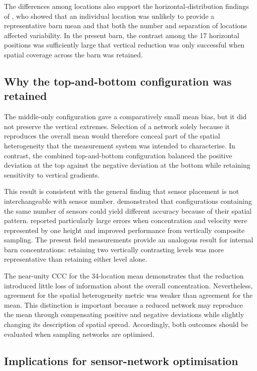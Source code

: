 \documentclass[12pt,a4paper]{article}
\begin{document}
The differences among locations also support the horizontal-distribution
findings of \citet{Durso2022}, who showed that an individual location was
unlikely to provide a representative barn mean and that both the number and
separation of locations affected variability. In the present barn, the
contrast among the 17 horizontal positions was sufficiently large that
vertical reduction was only successful when spatial coverage across the barn
was retained.

\subsection{Why the top-and-bottom configuration was retained}

The middle-only configuration gave a comparatively small mean bias, but it did
not preserve the vertical extremes. Selection of a network solely because it
reproduces the overall mean would therefore conceal part of the spatial
heterogeneity that the measurement system was intended to characterise. In
contrast, the combined top-and-bottom configuration balanced the positive
deviation at the top against the negative deviation at the bottom while
retaining sensitivity to vertical gradients.

This result is consistent with the general finding that sensor placement is
not interchangeable with sensor number. \citet{DeVogeleer2017} demonstrated
that configurations containing the same number of sensors could yield
different accuracy because of their spatial pattern. \citet{Janke2020}
reported particularly large errors when concentration and velocity were
represented by one height and improved performance from vertically composite
sampling. The present field measurements provide an analogous result for
internal barn concentrations: retaining two vertically contrasting levels was
more representative than retaining either level alone.

The near-unity CCC for the 34-location mean demonstrates that the reduction
introduced little loss of information about the overall concentration.
Nevertheless, agreement for the spatial heterogeneity metric was weaker than
agreement for the mean. This distinction is important because a reduced
network may reproduce the mean through compensating positive and negative
deviations while slightly changing its description of spatial spread.
Accordingly, both outcomes should be evaluated when sampling networks are
optimised.

\subsection{Implications for sensor-network optimisation}
\end{document}
